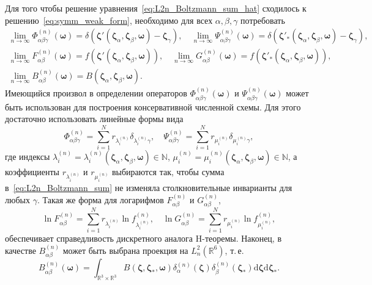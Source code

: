 \documentclass{article}
\newcommand{\dd}{\mathrm{d}}
\newcommand{\dzeta}{\boldsymbol{\dd\zeta}}
\newcommand{\bzeta}{\boldsymbol{\zeta}}
\newcommand{\bomega}{\boldsymbol{\omega}}
\begin{document}
Для того чтобы решение уравнения~\eqref{eq:L2n_Boltzmann_sum_hat} сходилось к решению~\eqref{eq:symm_weak_form},
необходимо для всех \(\alpha,\beta,\gamma\) потребовать
\begin{gather}
    \lim_{n\to\infty} \Phi^{(n)}_{\alpha\beta\gamma}(\bomega) =
        \delta(\bzeta'(\bzeta_\alpha,\bzeta_\beta,\bomega)-\bzeta_\gamma), \quad
    \lim_{n\to\infty} \Psi^{(n)}_{\alpha\beta\gamma}(\bomega) =
        \delta(\bzeta'_*(\bzeta_\alpha,\bzeta_\beta,\bomega)-\bzeta_\gamma), \label{eq:PhiPsi_limit}\\
    \lim_{n\to\infty} F^{(n)}_{\alpha\beta}(\bomega) =
        f(\bzeta'(\bzeta_\alpha,\bzeta_\beta,\bomega)), \quad
    \lim_{n\to\infty} G^{(n)}_{\alpha\beta}(\bomega) =
        f(\bzeta'_*(\bzeta_\alpha,\bzeta_\beta,\bomega)), \label{eq:FG_limit}\\
    \lim_{n\to\infty} B^{(n)}_{\alpha\beta}(\bomega) =
        B(\bzeta_\alpha,\bzeta_\beta,\bomega). \label{eq:B_limit}
\end{gather}
Имеющийся произвол в определении операторов \(\Phi^{(n)}_{\alpha\beta\gamma}(\bomega)\) и \(\Psi^{(n)}_{\alpha\beta\gamma}(\bomega)\)
может быть использован для построения консервативной численной схемы.
Для этого достаточно использовать линейные формы вида
\begin{equation}\label{eq:conservative_scheme}
    \Phi^{(n)}_{\alpha\beta\gamma} = \sum_{i=1}^N r_{\lambda^{(n)}_i} \delta_{\lambda^{(n)}_i\gamma}, \quad
    \Psi^{(n)}_{\alpha\beta\gamma} = \sum_{i=1}^N r_{\mu^{(n)}_i} \delta_{\mu^{(n)}_i\gamma},
\end{equation}
где индексы \(\lambda^{(n)}_i=\lambda^{(n)}_i(\bzeta_\alpha,\bzeta_\beta,\bomega)\in\mathbb{N}\),
\(\mu^{(n)}_i=\mu^{(n)}_i(\bzeta_\alpha,\bzeta_\beta,\bomega)\in\mathbb{N}\),
а коэффициенты \(r_{\lambda^{(n)}_i}\) и \(r_{\mu^{(n)}_i}\) выбираются так, чтобы сумма в~\eqref{eq:L2n_Boltzmann_sum}
не изменяла столкновительные инварианты для любых \(\gamma\).
Такая же форма для логарифмов \(F^{(n)}_{\alpha\beta}\) и \(G^{(n)}_{\alpha\beta}\),
\begin{equation}\label{eq:htheorem_scheme}
    \ln F^{(n)}_{\alpha\beta} = \sum_{i=1}^N r_{\lambda^{(n)}_i} \ln f^{(n)}_{\lambda^{(n)}_i}, \quad
    \ln G^{(n)}_{\alpha\beta} = \sum_{i=1}^N r_{\mu^{(n)}_i} \ln f^{(n)}_{\mu^{(n)}_i},
\end{equation}
обеспечивает справедливость дискретного аналога H-теоремы.
Наконец, в качестве \(B^{(n)}_{\alpha\beta}\) может быть выбрана проекция на \(L^2_n(\mathbb{R}^6)\), т.\,е.
\begin{equation}\label{eq:B_projection}
    B^{(n)}_{\alpha\beta}(\bomega) = \int_{\mathbb{R}^3\times\mathbb{R}^3} B(\bzeta,\bzeta_*,\bomega)
        \delta^{(n)}_\alpha(\bzeta) \delta^{(n)}_\beta(\bzeta_*) \dzeta\dzeta_*.
\end{equation}
\end{document}
